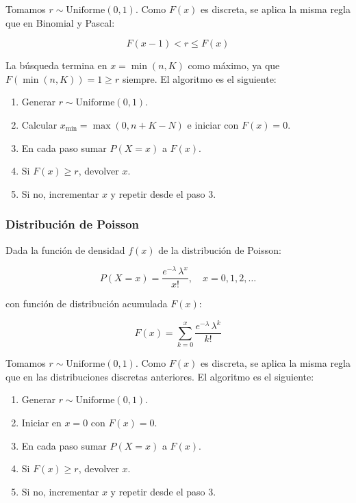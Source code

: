 \documentclass{article}
\begin{document}
Tomamos $r \sim \mathrm{Uniforme}(0,1)$. Como $F(x)$ es discreta, se aplica la misma regla
que en Binomial y Pascal:

\begin{equation}
    F(x-1) < r \leq F(x)
\end{equation}

La búsqueda termina en $x = \min(n, K)$ como máximo, ya que $F(\min(n,K)) = 1 \geq r$
siempre. El algoritmo es el siguiente:

\begin{enumerate}
    \item Generar $r \sim \mathrm{Uniforme}(0,1)$.
    \item Calcular $x_{\min} = \max(0, n + K - N)$ e iniciar con $F(x) = 0$.
    \item En cada paso sumar $P(X = x)$ a $F(x)$.
    \item Si $F(x) \geq r$, devolver $x$.
    \item Si no, incrementar $x$ y repetir desde el paso 3.
\end{enumerate}


\subsubsection{Distribución de Poisson}

Dada la función de densidad $f(x)$ de la distribución de Poisson:

\begin{equation}
    P(X = x) = \frac{e^{-\lambda}\,\lambda^x}{x!}, \quad x = 0, 1, 2, \ldots
\end{equation}

con función de distribución acumulada $F(x)$:

\begin{equation}
    F(x) = \sum_{k=0}^{x} \frac{e^{-\lambda}\,\lambda^k}{k!}
\end{equation}

Tomamos $r \sim \mathrm{Uniforme}(0,1)$. Como $F(x)$ es discreta, se aplica la misma regla
que en las distribuciones discretas anteriores. El algoritmo es el siguiente:

\begin{enumerate}
    \item Generar $r \sim \mathrm{Uniforme}(0,1)$.
    \item Iniciar en $x = 0$ con $F(x) = 0$.
    \item En cada paso sumar $P(X = x)$ a $F(x)$.
    \item Si $F(x) \geq r$, devolver $x$.
    \item Si no, incrementar $x$ y repetir desde el paso 3.
\end{enumerate}
\end{document}
